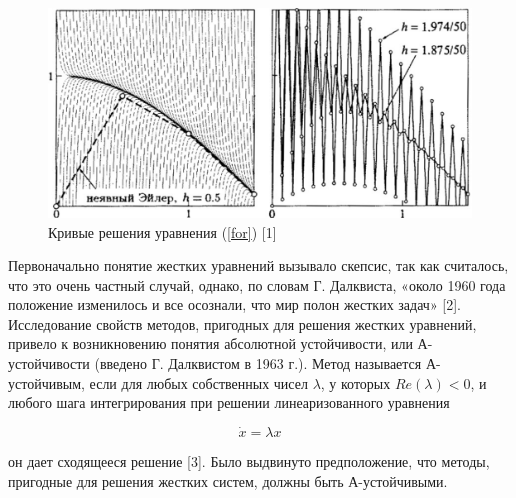 \documentclass[12pt,a4paper]{book}
\begin{document}
\begin{figure}[h!]
	\centering
	\includegraphics[width=0.7\linewidth]{photo/eulers}
	\caption[eur]{Кривые решения уравнения (\ref{for}) [1]}
	\label{fig:eulers}
\end{figure}
\newpage
Первоначально понятие жестких уравнений вызывало скепсис, так как считалось, что это очень частный случай, однако, по словам Г. Далквиста, «около 1960 года положение изменилось и все осознали, что мир полон жестких задач» [2].
Исследование свойств методов, пригодных для решения жестких уравнений, привело к возникновению понятия абсолютной устойчивости, или А-устойчивости (введено Г. Далквистом в 1963 г.). Метод называется А-устойчивым, если для любых собственных чисел $\lambda $, $ у $ которых $ Re(\lambda)<0 $, и любого шага интегрирования при решении линеаризованного уравнения

\begin{equation}
\dot{x} = \lambda x
\label{for2}
\end{equation}

он дает сходящееся решение [3]. Было выдвинуто предположение, что методы, пригодные для решения жестких систем, должны быть А-устойчивыми. 
\end{document}
